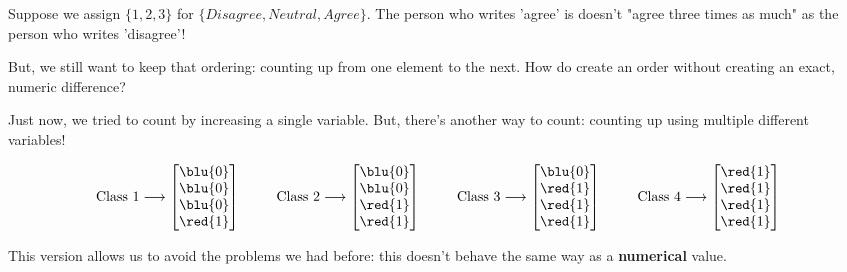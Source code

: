                 \miniex Suppose we assign $\{1,2,3\}$ for $\{Disagree, Neutral, Agree\}$. The person who writes 'agree' is doesn't "agree three times as much" as the person who writes 'disagree'!

                But, we still want to keep that ordering: counting up from one element to the next. How do create an order without creating an exact, numeric difference?

                Just now, we tried to count by increasing a single variable. But, there's another way to count: counting up using multiple different variables!

                \begin{equation*}
                    \text{Class 1} \longrightarrow
                    \begin{bmatrix}
                        \blu{0} \\ \blu{0} \\ \blu{0} \\ \red{1}
                    \end{bmatrix}
                    \qquad \;\;
                    \text{Class 2} \longrightarrow
                    \begin{bmatrix}
                        \blu{0} \\ \blu{0} \\ \red{1} \\ \red{1}
                    \end{bmatrix}
                    \qquad \;\;
                    \text{Class 3} \longrightarrow
                    \begin{bmatrix}
                        \blu{0} \\ \red{1} \\ \red{1} \\ \red{1}
                    \end{bmatrix}
                    \qquad \;\;
                    \text{Class 4} \longrightarrow
                    \begin{bmatrix}
                        \red{1} \\ \red{1} \\ \red{1} \\ \red{1}
                    \end{bmatrix}
                \end{equation*}
                
                This version allows us to avoid the problems we had before: this doesn't behave the same way as a \textbf{numerical} value.

